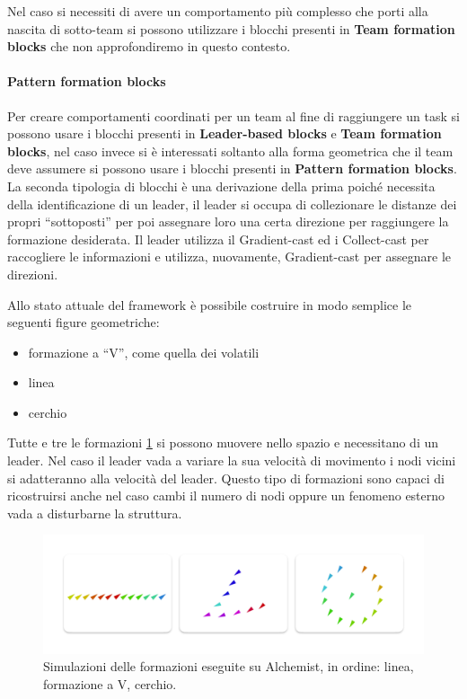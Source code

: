 \documentclass[12pt,a4paper,openright,twoside]{book}
\begin{document}
Nel caso si necessiti di avere un comportamento più complesso che porti alla nascita di sotto-team si possono utilizzare i blocchi presenti in \textbf{Team formation blocks} che non approfondiremo in questo contesto.

\paragraph{Pattern formation blocks}
Per creare comportamenti coordinati per un team al fine di raggiungere un task si possono usare i blocchi presenti in \textbf{Leader-based blocks} e \textbf{Team formation blocks}, nel caso invece si è interessati soltanto alla forma geometrica che il team deve assumere si possono usare i blocchi presenti in \textbf{Pattern formation blocks}. La seconda tipologia di blocchi è una derivazione della prima poiché necessita della identificazione di un leader, il leader si occupa di collezionare le distanze dei propri ``sottoposti'' per poi assegnare loro una certa direzione per raggiungere la formazione desiderata. Il leader utilizza il Gradient-cast ed i Collect-cast per raccogliere le informazioni e utilizza, nuovamente, Gradient-cast per assegnare le direzioni.

Allo stato attuale del framework è possibile costruire in modo semplice le seguenti figure geometriche:
\begin{itemize}
    \item formazione a ``V'', come quella dei volatili
    \item linea
    \item cerchio
\end{itemize}

Tutte e tre le formazioni \cref{fig:formation-simulations} \cite{Macroswarm} si possono muovere nello spazio e necessitano di un leader. Nel caso il leader vada a variare la sua velocità di movimento i nodi vicini si adatteranno alla velocità del leader. Questo tipo di formazioni sono capaci di ricostruirsi anche nel caso cambi il numero di nodi oppure un fenomeno esterno vada a disturbarne la struttura.

\begin{figure}
    \centering
    \includegraphics[width=.9\linewidth]{figures/formation-simulations.pdf}
    \caption{Simulazioni delle formazioni eseguite su Alchemist, in ordine: linea, formazione a V, cerchio.}
    \label{fig:formation-simulations}
\end{figure}
\end{document}
